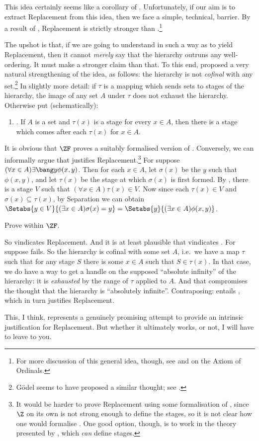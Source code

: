 \documentclass[../../../include/open-logic-section]{subfiles}
\begin{document}
This idea certainly seems like a corollary of \stagesinex. Unfortunately, if our aim is to extract Replacement from this idea, then we face a simple, technical, barrier. By a result of \cite{Montague1961}, Replacement is strictly stronger than .\footnote{For more discussion of this general idea, though, see \citet[\S13.2]{Potter2004} and \citet{IncurvatiThesis} on the Axiom of Ordinals.}

The upshot is that, if we are going to understand \stagesinex{} in such a way as to yield Replacement, then it cannot \emph{merely} say that the hierarchy outruns any well-ordering. It must make a stronger claim than that. To this end,  \cite{Shoenfield:AST} proposed a very natural strengthening of the idea, as follows: the hierarchy is not \emph{cofinal} with any set.\footnote{G\"odel seems to have proposed a similar thought; see \cite[223]{Potter2004}.} In slightly more detail: if $\tau$ is a mapping which sends sets to stages of the hierarchy, the image of any set $A$ under $\tau$ does not exhaust the hierarchy. Otherwise put (schematically): 
\begin{enumerate}
	\item[] \stagescofin. If $A$ is a set and $\tau(x)$ is a stage for every $x \in A$, then there is a stage which comes after each $\tau(x)$ for $x \in A$.
\end{enumerate}
It is obvious that $\ZF$ proves a suitably formalised version of \stagescofin. Conversely, we can informally argue that \stagescofin{} justifies Replacement.\footnote{It would be harder to prove Replacement using some formalisation of \stagescofin, since $\Z$ on its own is not strong enough to define the stages, so it is not clear how one would formalise \stagescofin. One good option, though, is to work in the theory presented by \cite{Potter2004}, which \emph{can} define stages.} For suppose $(\forall x \in A)\exists \bang y\phi(x,y)$. Then for each $x \in A$, let $\sigma(x)$ be the $y$ such that $\phi(x,y)$, and let $\tau(x)$ be the stage at which $\sigma(x)$ is first formed. By \stagescofin, there is a stage $V$ such that $(\forall x \in A)\tau(x)\in V$. Now since each $\tau(x) \in V$ and $\sigma(x) \subseteq \tau(x)$, by Separation we can obtain $\Setabs{y \in V}{(\exists x \in A)\sigma(x) = y} = \Setabs{y}{(\exists x \in A)\phi(x,y)}$.
\begin{prob}
	Prove \stagescofin{} within $\ZF$.
\end{prob}

So \stagescofin{} vindicates Replacement. And it is at least plausible that \stagesinex{} vindicates \stagescofin. For suppose \stagescofin{} fails. So the hierarchy is cofinal with some set $A$, i.e.\ we have a map $\tau$ such that for any stage $S$ there is some $x \in A$ such that $S \in \tau(x)$. In that case, we do have a way to get a handle on the supposed ``absolute infinity'' of the hierarchy: it is \emph{exhausted} by the range of $\tau$ applied to $A$. And that compromises the thought that the hierarchy is ``absolutely infinite''. Contraposing: \stagesinex{} entails \stagescofin, which in turn justifies Replacement.

This, I think, represents a genuinely promising attempt to provide an intrinsic justification for Replacement. But whether it ultimately works, or not, I will have to leave to you.
\end{document}
